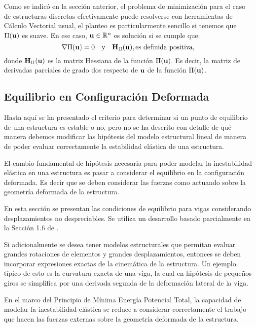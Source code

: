 Como se indicó en la sección anterior, el problema de minimización para el caso de estructuras discretas efectivamente puede resolverse con herramientas de Cálculo Vectorial usual, el planteo es particularmente sencillo si tenemos que $\Pi({\bf u})$ es suave. En ese caso, ${\bf u} \in \mathbb{R}^n$ es solución si se cumple que:
%
$$\nabla \Pi({\bf u})=0 \quad \text{y} \quad  {\bf H}_\Pi ({\bf u}), \text{es definida positiva},$$
%
donde ${\bf H}_\Pi({\bf u})$ es la matriz Hessiana de la función $\Pi({\bf u})$. Es decir, la matriz de derivadas parciales de grado dos respecto de ${\bf u}$ de la función $\Pi({\bf u})$.


\subsection{Equilibrio en Configuración Deformada}

Hasta aquí se ha presentado el criterio para determinar si un punto de equilibrio de una estructura es estable o no, pero no se ha descrito con detalle de qué manera debemos modificar las hipótesis del modelo estructural lineal de manera de poder evaluar correctamente la estabilidad elástica de una estructura.

El cambio fundamental de hipótesis necesaria para poder modelar la inestabilidad elástica en una estructura es pasar a considerar el equilibrio en la configuración deformada. Es decir que se deben considerar las fuerzas como actuando sobre la geometría deformada de la estructura.

En esta sección se presentan las condiciones de equilibrio para vigas considerando desplazamientos no despreciables. Se utiliza un desarrollo basado parcialmente en la Sección 1.6 de \citep{yoo2011}.

Si adicionalmente se desea tener modelos estructurales que permitan evaluar grandes rotaciones de elementos y grandes desplazamientos, entonces se deben incorporar expresiones exactas de la cinemática de la estructura. Un ejemplo típico de esto es la curvatura exacta de una viga, la cual en hipótesis de pequeños giros se simplifica por una derivada segunda de la deformación lateral de la viga.

En el marco del Principio de Mínima Energía Potencial Total, la capacidad de modelar la inestabilidad elástica se reduce a considerar correctamente el trabajo que hacen las fuerzas externas sobre la geometría deformada de la estructura.


